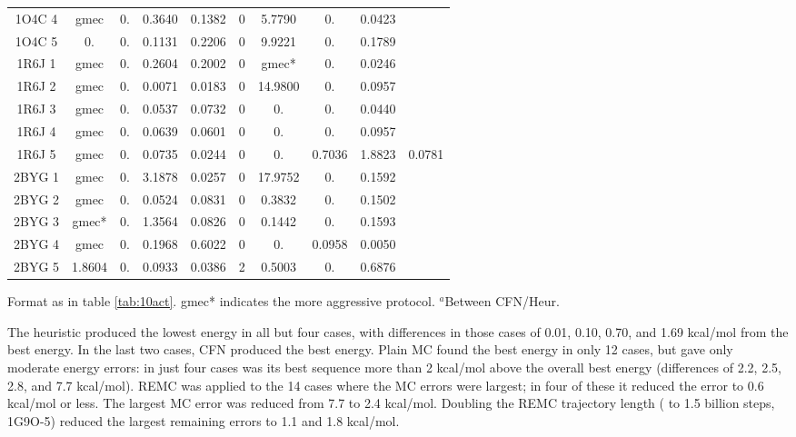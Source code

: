 \begin{table}[!htbp]
\begin{center}
\begin{tabular}{cccccccccc}
1O4C 4 &  gmec    & 0.     & 0.3640 & 0.1382 & 0 & 5.7790    & 0.     & 0.0423 &        \\             
1O4C 5 &  0.      & 0.     & 0.1131 & 0.2206 & 0 & 9.9221    & 0.     & 0.1789 &        \\      
1R6J 1 &  gmec    & 0.     & 0.2604 & 0.2002 & 0 & gmec*     & 0.     & 0.0246 &        \\        
1R6J 2 &  gmec    & 0.     & 0.0071 & 0.0183 & 0 & 14.9800   & 0.     & 0.0957 &        \\        
1R6J 3 &  gmec    & 0.     & 0.0537 & 0.0732 & 0 & 0.        & 0.     & 0.0440 &        \\       
1R6J 4 &  gmec    & 0.     & 0.0639 & 0.0601 & 0 & 0.        & 0.     & 0.0957 &        \\        
1R6J 5 &  gmec    & 0.     & 0.0735 & 0.0244 & 0 & 0.        & 0.7036 & 1.8823 & 0.0781 \\        
2BYG 1 &  gmec    & 0.     & 3.1878 & 0.0257 & 0 & 17.9752   & 0.     & 0.1592 &        \\        
2BYG 2 &  gmec    & 0.     & 0.0524 & 0.0831 & 0 & 0.3832    & 0.     & 0.1502 &        \\        
2BYG 3 &  gmec*   & 0.     & 1.3564 & 0.0826 & 0 & 0.1442    & 0.     & 0.1593 &        \\        
2BYG 4 &  gmec    & 0.     & 0.1968 & 0.6022 & 0 & 0.        & 0.0958 & 0.0050 &        \\        
2BYG 5 &  1.8604  & 0.     & 0.0933 & 0.0386 & 2 & 0.5003    & 0.     & 0.6876 &        \\   
\hline
\end{tabular}
{\small \noindent Format as in table \ref{tab:10act}. gmec* indicates the more aggressive protocol.
$^a$Between CFN/Heur.}
\end{center}
\end{table}




The heuristic produced the lowest energy in all but four cases, with differences in those cases of 0.01, 0.10, 0.70, and 1.69 kcal/mol from the best energy. In the last two cases, CFN produced the best energy. Plain MC found the best energy in only 12 cases, but gave only moderate energy errors: in just four cases was its best sequence more than 2 kcal/mol above the overall best energy (differences of 2.2, 2.5, 2.8, and 7.7 kcal/mol). REMC was applied to the 14 cases where the MC errors were largest; in four of these it reduced the error to 0.6 kcal/mol or less. The largest MC error was reduced from 7.7 to 2.4 kcal/mol. Doubling the REMC trajectory length ( to 1.5 billion steps, 1G9O-5) reduced the largest remaining errors to 1.1 and 1.8 kcal/mol.

